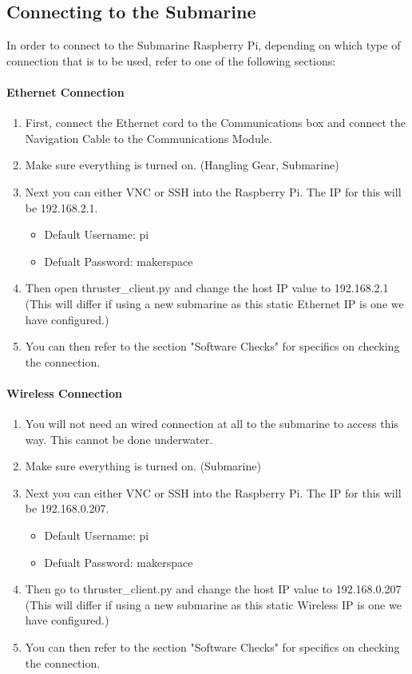 \documentclass[
18pt, %
a4paper, %
oneside, %
headinclude,footinclude, %
]{scrartcl}
\begin{document}
\subsection{Connecting to the Submarine}
In order to connect to the Submarine Raspberry Pi, depending on which type of connection that is to be used, refer to one of the following sections:

\paragraph{Ethernet Connection}
\begin{enumerate}
	\item First, connect the Ethernet cord to the Communications box and connect the Navigation Cable to the Communications Module.	
	\item Make sure everything is turned on. (Hangling Gear, Submarine) 
	\item Next you can either VNC or SSH into the Raspberry Pi. The IP for this will be 192.168.2.1.
	\begin{itemize}
		\item Default Username: pi
		\item Defualt Password: makerspace
	\end{itemize}
	\item Then open thruster\_client.py and change the host IP value to 192.168.2.1 (This will differ if using a new submarine as this static Ethernet IP is one we have configured.)
	\item You can then refer to the section "Software Checks" for specifics on checking the connection.
\end{enumerate}

\paragraph{Wireless Connection}
\begin{enumerate}
	\item You will not need an wired connection at all to the submarine to access this way. This cannot be done underwater.	
	\item Make sure everything is turned on. (Submarine) 
	\item Next you can either VNC or SSH into the Raspberry Pi. The IP for this will be 192.168.0.207.
	\begin{itemize}
		\item Default Username: pi
		\item Defualt Password: makerspace
	\end{itemize}
	\item Then go to thruster\_client.py and change the host IP value to 192.168.0.207 (This will differ if using a new submarine as this static Wireless IP is one we have configured.)
	\item You can then refer to the section "Software Checks" for specifics on checking the connection.
\end{enumerate}
\end{document}
